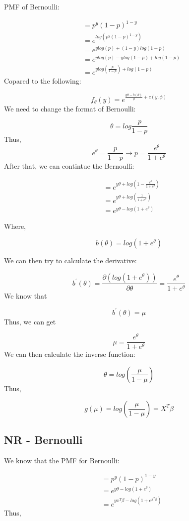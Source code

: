 \documentclass[]{book}
\begin{document}
PMF of Bernoulli:

\[ \begin{aligned} &= p^y(1-p)^{1-y}  \\ &=e^{log(p^y(1-p)^{1-y})} \\ &= e^{ylog(p)+(1-y)log(1-p)}\\ &= e^{ylog(p)-ylog(1-p)+log(1-p)}\\ &=e^{ylog(\frac{p}{1-p})+log(1-p)} \end{aligned} \]
Copared to the following:

\[f_{\theta}(y)=e^{\frac{y\theta-b(\theta)}{\phi}+c(y,\phi)}\] We need
to change the format of Bernoulli:

\[\theta= log \frac{p}{1-p}\] Thus,
\[e^{\theta}=\frac{p}{1-p} \rightarrow p=\frac{e^{\theta}}{1+e^{\theta}} \]
After that, we can contintue the Bernoulli:

\[\begin{aligned} &= e^{y\theta+log(1-\frac{e^{\theta}}{1+e^{\theta}})} \\ &=e^{y\theta+log(\frac{1}{1+e^{\theta}})} \\ &=e^{y\theta-log(1+e^{\theta})} \end{aligned}\]

Where,

\[b(\theta)=log(1+e^{\theta})\]

We can then try to calculate the derivative:

\[b^{'}(\theta)=\frac{\partial (log(1+e^{\theta}))}{\partial \theta}=\frac{e^{\theta}}{1+e^{\theta}}\]
We know that

\[b^{'}(\theta)=\mu\] Thus, we can get

\[\mu=\frac{e^{\theta}}{1+e^{\theta}}\] We can then calculate the
inverse function:

\[\theta=log(\frac{\mu}{1-\mu})\] Thus,

\[g(\mu)=log(\frac{\mu}{1-\mu})=X^T \beta\]

\subsection{NR - Bernoulli}\label{nr---bernoulli}

We know that the PMF for Bernoulli:

\[\begin{aligned} &= p^y(1-p)^{1-y} \\  &=e^{y\theta-log(1+e^{\theta})} \\ &=e^{yx^T \beta-log(1+e^{x^T \beta})} \end{aligned}\]
Thus,
\end{document}
